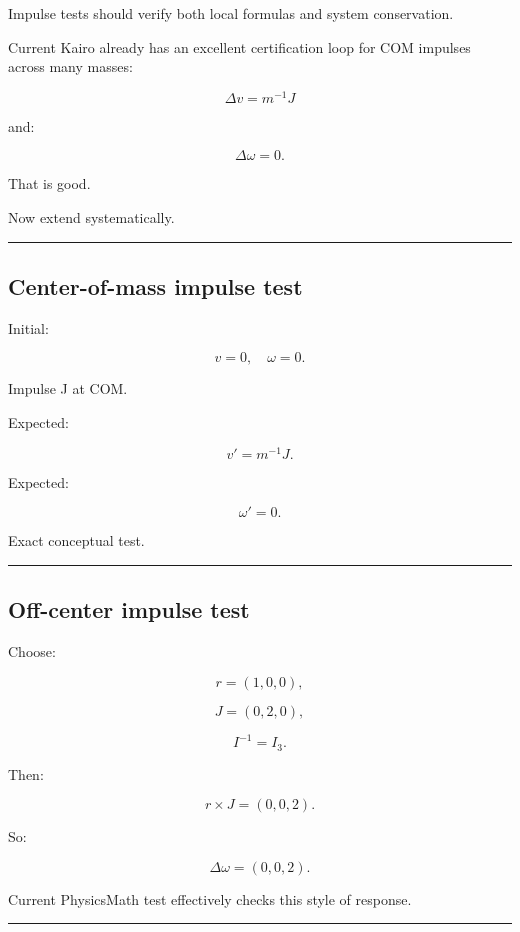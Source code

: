Impulse tests should verify both local formulas and system conservation.

Current Kairo already has an excellent certification loop for COM impulses across many masses:

\[
\Delta v
=
m^{-1}J
\]

and:

\[
\Delta\omega=0.
\]

That is good.

Now extend systematically.

\begin{center}\rule{0.5\linewidth}{0.5pt}\end{center}

\subsection{Center-of-mass impulse test}\label{06-engine-ii-ch039-center-of-mass-impulse-test}

Initial:

\[
v=0,
\quad
\omega=0.
\]

Impulse J at COM.

Expected:

\[
v'=m^{-1}J.
\]

Expected:

\[
\omega'=0.
\]

Exact conceptual test.

\begin{center}\rule{0.5\linewidth}{0.5pt}\end{center}

\subsection{Off-center impulse test}\label{06-engine-ii-ch039-off-center-impulse-test}

Choose:

\[
r=(1,0,0),
\]

\[
J=(0,2,0),
\]

\[
I^{-1}=I_3.
\]

Then:

\[
r\times J
=
(0,0,2).
\]

So:

\[
\Delta\omega=(0,0,2).
\]

Current PhysicsMath test effectively checks this style of response.

\begin{center}\rule{0.5\linewidth}{0.5pt}\end{center}

